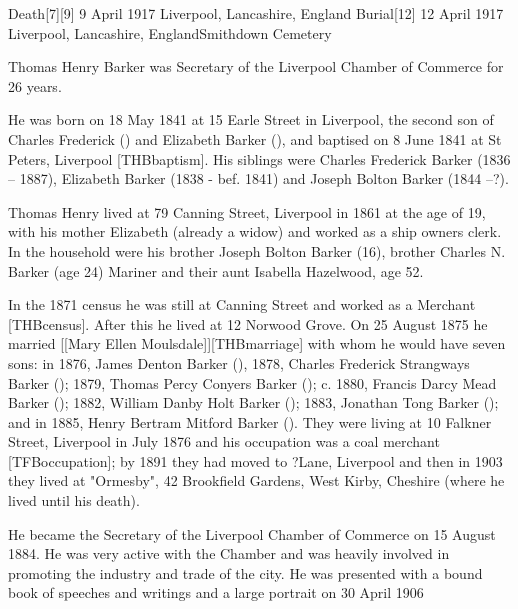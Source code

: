
Death[7][9] 	9 April 1917 	Liverpool, Lancashire, England
Burial[12] 	12 April 1917 	Liverpool, Lancashire, EnglandSmithdown Cemetery

Thomas Henry Barker was Secretary of the Liverpool Chamber of Commerce for 26 years.\cite{THBbio}

He was born on 18 May 1841\cite{THBbirth} at 15 Earle Street in Liverpool,\cite{THBplantagenets} the second son of Charles Frederick () and Elizabeth Barker (), and baptised on 8 June 1841 at St Peters, Liverpool [THBbaptism].  His siblings were Charles Frederick Barker (1836 -- 1887),  Elizabeth Barker (1838 - bef. 1841) and Joseph Bolton Barker (1844 --?). 

Thomas Henry lived at 79 Canning Street, Liverpool in 1861 at the age of 19, with his mother Elizabeth (already a widow) and worked as a ship owners clerk.  In the household were his brother Joseph Bolton Barker (16), brother Charles N. Barker (age 24) Mariner and their aunt Isabella Hazelwood, age 52.

In the 1871 census he was still at Canning Street and worked as a Merchant [THBcensus]. After this he lived at 12 Norwood Grove.\cite{THBcensus} On 25 August 1875 he married [[Mary Ellen Moulsdale]][THBmarriage] with whom he would have seven sons:\cite{THBplantagenets}
in 1876, James Denton Barker (),
1878, Charles Frederick Strangways Barker ();
1879, Thomas Percy Conyers Barker ();
c. 1880, Francis Darcy Mead Barker ();
1882, William Danby Holt Barker ();
1883, Jonathan Tong Barker (); and in
1885, Henry Bertram Mitford Barker ().
They were living at 10 Falkner Street, Liverpool in July 1876 and his occupation was a coal merchant [TFBoccupation];  by 1891 they had moved to ?Lane, Liverpool and then in 1903 they lived at "Ormesby", 42 Brookfield Gardens, West Kirby, Cheshire (where he lived until his death).\cite{THBdeathcert}

He became the Secretary of the Liverpool Chamber of Commerce on 15 August 1884.  He was very active with the Chamber and was heavily involved in promoting the industry and trade of the city.  He was presented with a bound book of speeches and writings and a large portrait on 30 April 1906

